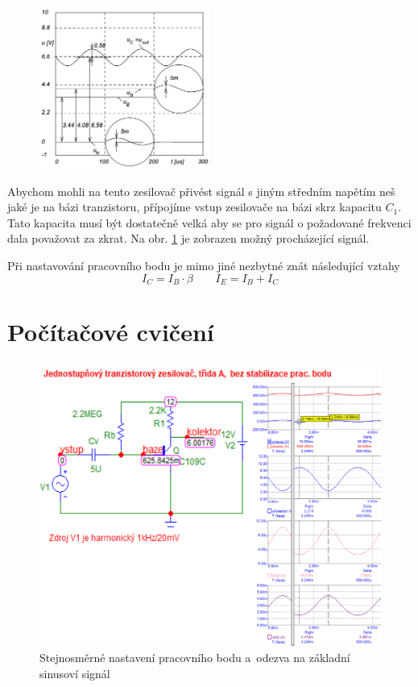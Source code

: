 \documentclass{article}
\newcommand \obr[1]
{ obr. \ref{#1}}
\begin{document}
\vspace{1mm}
\begin{figure}
  \vspace{-10mm}
  \includegraphics[width=0.5\textwidth]{vstup-baze-vystup.png}
  \caption{\label{vstup_baze_vystup}}
\end{figure}
Abychom mohli na tento zesilovač přivést signál s jiným středním napětím neš jaké je na bázi tranzistoru, přípojíme vstup zesilovače na bázi skrz kapacitu \(C_1\).
Tato kapacita musí být dostatečně velká aby se pro signál o požadované frekvenci dala považovat za zkrat.
Na \obr{vstup_baze_vystup} je zobrazen možný procházející signál.

Při nastavování pracovního bodu je mimo jiné nezbytné znát následující vztahy
\begin{equation}
    I_C=I_B\cdot\beta \quad \quad I_{E}=I_{B}+I_{C}
    \label{proud_kolektoru}
\end{equation}
\newpage

\section{Počítačové cvičení}
\begin{figure}[H]
  \includegraphics[width=\textwidth]{PC/BJT/prac_bod_sim_1.png}
  \caption{\label{prac_bod_sim_1} Stejnosměrné nastavení pracovního bodu a~odezva na základní sinusoví signál}
\end{figure}
\end{document}
